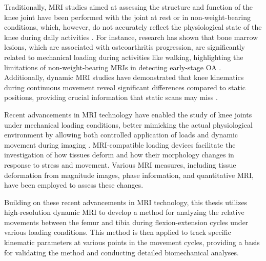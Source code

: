\documentclass{micro-econ-thesis}
\begin{document}
Traditionally, MRI studies aimed at assessing the structure and function of the knee joint have been performed with the joint at rest or in non-weight-bearing conditions, which, however, do not accurately reflect the physiological state of the knee during daily activities \parencite{blankevoort_envelope_1988}. For instance, research has shown that bone marrow lesions, which are associated with osteoarthritis progression, are significantly related to mechanical loading during activities like walking, highlighting the limitations of non-weight-bearing MRIs in detecting early-stage OA \parencite{bennell_bone_2010}. Additionally, dynamic MRI studies have demonstrated that knee kinematics during continuous movement reveal significant differences compared to static positions, providing crucial information that static scans may miss \parencite{dentremont_dynamicbased_2013}.

Recent advancements in MRI technology have enabled the study of knee joints under mechanical loading conditions, better mimicking the actual physiological environment by allowing both controlled application of loads and dynamic movement during imaging \parencite{brisson_repeatability_2024} \parencite{conconi_-vivo_2023} \parencite{jogi_device_2022}. MRI-compatible loading devices facilitate the investigation of how tissues deform and how their morphology changes in response to stress and movement.  Various MRI measures, including tissue deformation from magnitude images, phase information, and quantitative MRI, have been employed to assess these changes. 

Building on these recent advancements in MRI technology, this thesis utilizes high-resolution dynamic MRI to develop a method for analyzing the relative movements between the femur and tibia during flexion-extension cycles under various loading conditions.  This method is then applied to track specific kinematic parameters at various points in the movement cycles, providing a basis for validating the method and conducting detailed biomechanical analyses.
\end{document}
